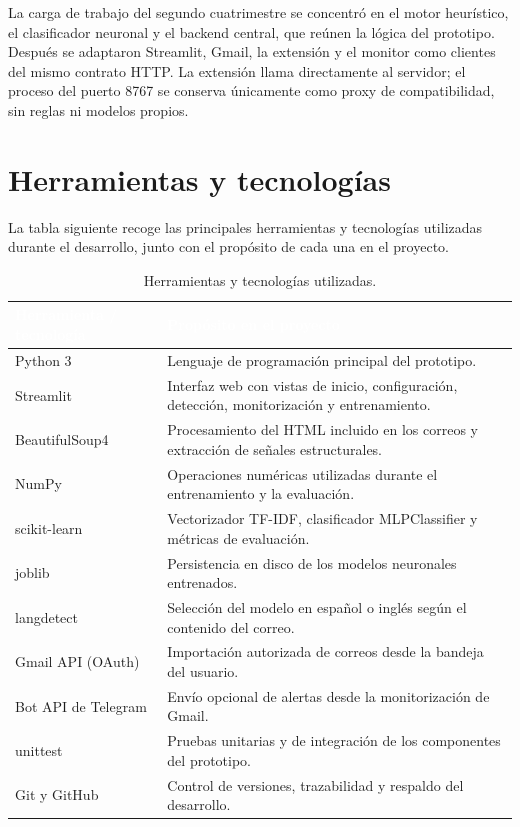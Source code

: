 \documentclass[11pt,a4paper,oneside]{report}
\begin{document}
La carga de trabajo del segundo cuatrimestre se concentró en el motor heurístico, el clasificador neuronal y el backend central, que reúnen la lógica del prototipo. Después se adaptaron Streamlit, Gmail, la extensión y el monitor como clientes del mismo contrato HTTP. La extensión llama directamente al servidor; el proceso del puerto 8767 se conserva únicamente como proxy de compatibilidad, sin reglas ni modelos propios.



\section{Herramientas y tecnologías}

La tabla siguiente recoge las principales herramientas y tecnologías utilizadas durante el desarrollo, junto con el propósito de cada una en el proyecto.

\begingroup
\begin{table}[H]
  \centering
  \small
  \caption{Herramientas y tecnologías utilizadas.}
  \label{tab:4-2}
  \begin{tabularx}{\textwidth}{|X|X|}
    \hline
    \rowcolor{uemcgreen}
    \textcolor{white}{\textbf{Herramienta / tecnología}} & \textcolor{white}{\textbf{Propósito en el proyecto}} \\
    \hline
    Python 3 & Lenguaje de programación principal del prototipo. \\
    \hline
    \rowcolor{tablelight}
    Streamlit & Interfaz web con vistas de inicio, configuración, detección, monitorización y entrenamiento. \\
    \hline
    BeautifulSoup4 & Procesamiento del HTML incluido en los correos y extracción de señales estructurales. \\
    \hline
    \rowcolor{tablelight}
    NumPy & Operaciones numéricas utilizadas durante el entrenamiento y la evaluación. \\
    \hline
    scikit-learn & Vectorizador TF-IDF, clasificador MLPClassifier y métricas de evaluación. \\
    \hline
    \rowcolor{tablelight}
    joblib & Persistencia en disco de los modelos neuronales entrenados. \\
    \hline
    langdetect & Selección del modelo en español o inglés según el contenido del correo. \\
    \hline
    \rowcolor{tablelight}
    Gmail API (OAuth) & Importación autorizada de correos desde la bandeja del usuario. \\
    \hline
    Bot API de Telegram & Envío opcional de alertas desde la monitorización de Gmail. \\
    \hline
    \rowcolor{tablelight}
    unittest & Pruebas unitarias y de integración de los componentes del prototipo. \\
    \hline
    Git y GitHub & Control de versiones, trazabilidad y respaldo del desarrollo. \\
    \hline
  \end{tabularx}
\end{table}
\endgroup
\end{document}
